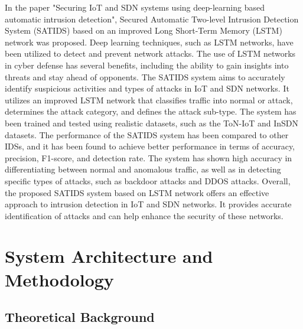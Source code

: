 \par 
In the paper "Securing IoT and SDN systems using deep-learning based automatic intrusion detection", Secured Automatic Two-level Intrusion Detection System (SATIDS) based on an improved Long Short-Term Memory (LSTM) network was proposed. Deep learning techniques, such as LSTM networks, have been utilized to detect and prevent network attacks. The use of LSTM networks in cyber defense has several benefits, including the ability to gain insights into threats and stay ahead of opponents. The SATIDS system aims to accurately identify suspicious activities and types of attacks in IoT and SDN networks. It utilizes an improved LSTM network that classifies traffic into normal or attack, determines the attack category, and defines the attack sub-type. The system has been trained and tested using realistic datasets, such as the ToN-IoT and InSDN datasets. The performance of the SATIDS system has been compared to other IDSs, and it has been found to achieve better performance in terms of accuracy, precision, F1-score, and detection rate. The system has shown high accuracy in differentiating between normal and anomalous traffic, as well as in detecting specific types of attacks, such as backdoor attacks and DDOS attacks. Overall, the proposed SATIDS system based on LSTM network offers an effective approach to intrusion detection in IoT and SDN networks. It provides accurate identification of attacks and can help enhance the security of these networks.\cite{ELSAYED2023102211}
\chapter{System Architecture and Methodology}
\vspace{-18pt}
\section{Theoretical Background}
